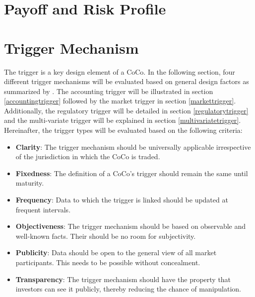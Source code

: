 
\section{Payoff and Risk Profile}

\section{Trigger Mechanism}

The trigger is a key design element of a CoCo. In the following section, four different trigger mechanisms will be evaluated based on general design factors as summarized by \citet{erismann2015pricing}. The accounting trigger will be illustrated in section \ref{accountingtrigger} followed by the market trigger in section \ref{markettrigger}. Additionally, the regulatory trigger will be detailed in section \ref{regulatorytrigger} and the multi-variate trigger will be explained in section \ref{multivariatetrigger}. Hereinafter, the trigger types will be evaluated based on the following criteria:

\begin{itemize}
\renewcommand\labelitemi{--}
\item \textbf{Clarity}:  The trigger mechanism should be universally applicable irrespective of the jurisdiction in which the CoCo is traded.
\item \textbf{Fixedness}: The definition of a CoCo's trigger should remain the same until maturity.
\item \textbf{Frequency}: Data to which the trigger is linked should be updated at frequent intervals.
\item \textbf{Objectiveness}: The trigger mechanism should be based on observable and well-known facts. Their should be no room for subjectivity.
\item \textbf{Publicity}: Data should be open to the general view of all market participants. This needs to be possible without concealment. 
\item \textbf{Transparency}: The trigger mechanism should have the property that investors can see it publicly, thereby reducing the chance of manipulation.
\end{itemize}


